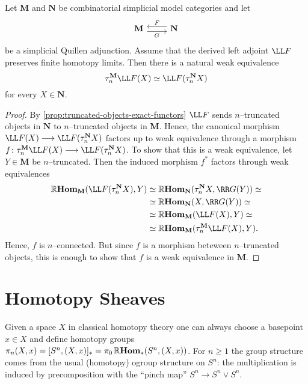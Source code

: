 \begin{proposition}\label{prop:left-exact-preserves-trunc}
  Let \(\mathbf M\) and \(\mathbf N\) be combinatorial simplicial
  model categories and let
  \[
  \begin{tikzcd}
    \mathbf M \arrow[r, shift right=.7ex, "G"'] & \arrow[l, shift right=.7ex, "F"'] \mathbf N
  \end{tikzcd}
  \]
  be a simplicial Quillen adjunction. Assume that the derived left adjoint \(\LL F\) preserves finite homotopy limits. Then there is a natural weak equivalence
  \[\trunc{n}^{\mathbf M} \LL F(X) \simeq \LL F(\trunc{n}^{\mathbf N} X)\]
  for every \(X\in\mathbf N\).
\end{proposition}
\begin{proof}
  By \autoref{prop:truncated-objects-exact-functors} \(\LL F\) sends
  \(n\)--truncated objects in \(\mathbf N\) to \(n\)--truncated
  objects in \(\mathbf M\). Hence, the canonical morphism \(\LL
  F(X)\to\LL F(\trunc{n}^{\mathbf N}X)\) factors up to weak
  equivalence through a morphism \(f\colon \trunc{n}^{\mathbf M}\LL
  F(X)\to \LL F(\trunc{n}^{\mathbf N}X)\). To show that this is a weak
  equivalence, let \(Y\in\mathbf M\) be \(n\)--truncated. Then the
  induced morphism \(f^{*}\) factors through weak equivalences
  \begin{align*}
    \RHom_{\mathbf M}(\LL F(\trunc{n}^{\mathbf N}X), Y)&\simeq \RHom_{\mathbf N}(\trunc{n}^{\mathbf N}X, \RR G(Y)) \simeq\\
                                                    &\simeq \RHom_{\mathbf N}(X, \RR G(Y)) \simeq \\
                                                    &\simeq \RHom_{\mathbf M}(\LL F(X), Y) \simeq \\
                                                    &\simeq \RHom_{\mathbf M}(\trunc{n}^{\mathbf M}\LL F(X), Y).
  \end{align*}
  Hence, \(f\) is \(n\)--connected. But since \(f\) is a morphism
  beteween \(n\)--truncated objects, this is enough to show that \(f\)
  is a weak equivalence in \(\mathbf M\).
\end{proof}

\section{Homotopy Sheaves}

Given a space \(X\) in classical homotopy theory one can always choose
a basepoint \(x\in X\) and define homotopy groups \(\pi_{n}(X,x) =
[S^{n}, (X,x)]_{*} = \pi_{0}\operatorname{\mathbb{R}\textnormal{\bfseries Hom}}_{*}(S^{n}, (X,x))\). For \(n\geq 1\)
the group structure comes from the usual (homotopy) ogroup structure
on \(S^{n}\): the multiplication is induced by precomposition with the
\enquote{pinch map} \(S^{n}\to S^{n}\vee S^{n}\).

